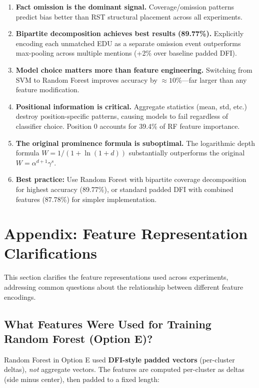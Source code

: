 \documentclass[12pt,a4paper]{article}
\begin{document}
\begin{enumerate}
\item \textbf{Fact omission is the dominant signal.} Coverage/omission patterns predict bias
better than RST structural placement across all experiments.

\item \textbf{Bipartite decomposition achieves best results (89.77\%).} Explicitly encoding
each unmatched EDU as a separate omission event outperforms max-pooling across multiple
mentions (+2\% over baseline padded DFI).

\item \textbf{Model choice matters more than feature engineering.} Switching from SVM to
Random Forest improves accuracy by $\approx10\%$---far larger than any feature modification.

\item \textbf{Positional information is critical.} Aggregate statistics (mean, std, etc.)
destroy position-specific patterns, causing models to fail regardless of classifier choice.
Position 0 accounts for 39.4\% of RF feature importance.

\item \textbf{The original prominence formula is suboptimal.} The logarithmic depth formula
$W = 1/(1+\ln(1+d))$ substantially outperforms the original $W = \alpha^{d+1}\gamma^s$.

\item \textbf{Best practice:} Use Random Forest with bipartite coverage decomposition for
highest accuracy (89.77\%), or standard padded DFI with combined features (87.78\%) for simpler
implementation.
\end{enumerate}

\section{Appendix: Feature Representation Clarifications}

This section clarifies the feature representations used across experiments, addressing common
questions about the relationship between different feature encodings.

\subsection{What Features Were Used for Training Random Forest (Option E)?}

Random Forest in Option E used \textbf{DFI-style padded vectors} (per-cluster deltas),
\textit{not} aggregate vectors. The features are computed per-cluster as deltas (side minus center),
then padded to a fixed length:
\end{document}
